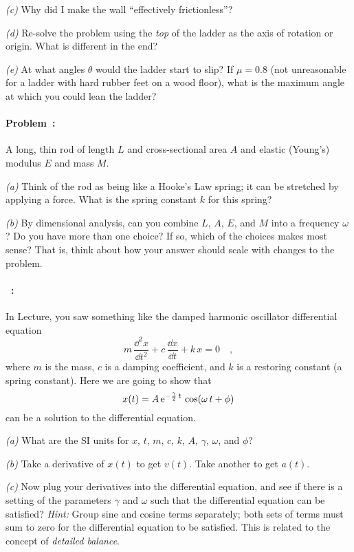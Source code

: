 \documentclass[12pt]{article}
\begin{document}
\textsl{(c)} Why did I make the wall ``effectively frictionless''?

\textsl{(d)} Re-solve the problem using the \emph{top} of the ladder
as the axis of rotation or origin.  What is different in the end?

\textsl{(e)} At what angles $\theta$ would the ladder start to slip?
If $\mu=0.8$ (not unreasonable for a ladder with hard rubber feet on a wood
floor), what is the maximum angle at which you could lean the ladder?

\paragraph{Problem~\theproblem:}%
A long, thin rod of length $L$ and cross-sectional area $A$ and
elastic (Young's) modulus $E$ and mass $M$.

\textsl{(a)} Think of the rod as being like a Hooke's Law spring; it
can be stretched by applying a force.  What is the spring constant $k$
for this spring?

\textsl{(b)} By dimensional analysis, can you combine $L$, $A$, $E$,
and $M$ into a frequency $\omega$?  Do you have more than one choice?  If so,
which of the choices makes most sense? That is, think about how your
answer should scale with changes to the problem.

\paragraph{\problemname~\theproblem:}%
In Lecture, you saw something like the damped harmonic oscillator
differential equation
\begin{equation}
m\,\frac{\dd^2 x}{\dd t^2} + c\,\frac{\dd x}{\dd t} + k\,x = 0 \quad ,
\end{equation}
where $m$ is the mass, $c$ is a damping coefficient, and $k$ is a
restoring constant (a spring constant).  Here we are going to show
that
\begin{equation}
x(t) = A\,\mathrm{e}^{-\frac{\gamma}{2}\,t}\,\cos (\omega\,t + \phi)
\end{equation}
can be a solution to the differential equation.

\textsl{(a)} What are the SI units for $x$, $t$, $m$, $c$, $k$, $A$, $\gamma$, $\omega$, and $\phi$?

\textsl{(b)} Take a derivative of $x(t)$ to get $v(t)$. Take another
to get $a(t)$.

\textsl{(c)} Now plug your derivatives into the differential equation,
and see if there is a setting of the parameters $\gamma$ and $\omega$
such that the differential equation can be satisfied? \emph{Hint:}
Group sine and cosine terms separately; both sets of terms must sum to
zero for the differential equation to be satisfied. This is related to
the concept of \emph{detailed balance}.
\end{document}
